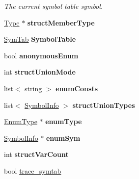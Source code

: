 \begin{DoxyCompactItemize}
\begin{DoxyCompactList}\small\item\em The current symbol table symbol. \end{DoxyCompactList}\item 
\hypertarget{classCCompiler_a81717a338fc2dec88849f062ced197bd}{\hyperlink{classType}{Type} $\ast$ {\bfseries struct\-Member\-Type}}\label{classCCompiler_a81717a338fc2dec88849f062ced197bd}

\item 
\hypertarget{classCCompiler_a3315c6b835f8f910f175630d365592f0}{\hyperlink{classSymTab}{Sym\-Tab} {\bfseries Symbol\-Table}}\label{classCCompiler_a3315c6b835f8f910f175630d365592f0}

\item 
\hypertarget{classCCompiler_a89ebb609ccc09244cb053653e140f3af}{bool {\bfseries anonymous\-Enum}}\label{classCCompiler_a89ebb609ccc09244cb053653e140f3af}

\item 
\hypertarget{classCCompiler_aac65ea272c3c5420391022d16e01bc35}{int {\bfseries struct\-Union\-Mode}}\label{classCCompiler_aac65ea272c3c5420391022d16e01bc35}

\item 
\hypertarget{classCCompiler_a407df7e4274f95a2e2ec253d6622a610}{list$<$ string $>$ {\bfseries enum\-Consts}}\label{classCCompiler_a407df7e4274f95a2e2ec253d6622a610}

\item 
\hypertarget{classCCompiler_a01d0aa35be4c0654ff619801f4e5a916}{list$<$ \hyperlink{structSymbolInfo}{Symbol\-Info} $>$ {\bfseries struct\-Union\-Types}}\label{classCCompiler_a01d0aa35be4c0654ff619801f4e5a916}

\item 
\hypertarget{classCCompiler_a05461404c98f0c49ff711239228b05f7}{\hyperlink{classEnumType}{Enum\-Type} $\ast$ {\bfseries enum\-Type}}\label{classCCompiler_a05461404c98f0c49ff711239228b05f7}

\item 
\hypertarget{classCCompiler_acdc852314e1f491acf4eedd0d6342bb2}{\hyperlink{structSymbolInfo}{Symbol\-Info} $\ast$ {\bfseries enum\-Sym}}\label{classCCompiler_acdc852314e1f491acf4eedd0d6342bb2}

\item 
\hypertarget{classCCompiler_a786c697900f9a3e71f017c87274b3162}{int {\bfseries struct\-Var\-Count}}\label{classCCompiler_a786c697900f9a3e71f017c87274b3162}

\item 
\hypertarget{classCCompiler_a3c5de89c525d74fa8cbc0ff024cd1ec3}{bool \hyperlink{classCCompiler_a3c5de89c525d74fa8cbc0ff024cd1ec3}{trace\-\_\-symtab}}\label{classCCompiler_a3c5de89c525d74fa8cbc0ff024cd1ec3}


\end{DoxyCompactItemize}
